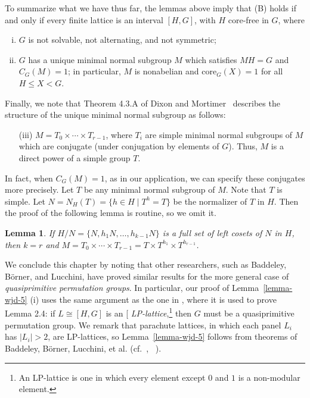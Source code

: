 \documentclass[cm,dissertation]{uhthesis}
\theoremstyle{plain}
\newtheorem{lemma}[theorem]{Lemma}
\theoremstyle{definition}
\theoremstyle{remark}
\numberwithin{theorem}{section}
\numberwithin{claim}{chapter}
\numberwithin{equation}{section}
\numberwithin{conjecture}{chapter}
\newcommand{\<}{\ensuremath{\langle}}
\renewcommand{\>}{\ensuremath{\rangle}}
\renewcommand{\leq}{\ensuremath{\leqslant}}
\newcommand{\core}{\ensuremath{\mathrm{core}}}
\newcommand{\0}{\ensuremath{\mathbf{0}}}
\newcommand{\1}{\ensuremath{\mathbf{1}}}
\newcommand{\2}{\ensuremath{\mathbf{2}}}
\newcommand{\3}{\ensuremath{\mathbf{3}}}
\newcommand{\4}{\ensuremath{\mathbf{4}}}
\newcommand{\5}{\ensuremath{\mathbf{5}}}
\newcommand{\indexit}[1]{\index{#1|textit}}
\def\defn#1{\gdef\defnstring{#1}%
  \xdef\dodefnii{{\noexpand\em
       \defnstring}\noexpand\indexit{\defnstring}\noexpand\makeatother}%
  \futurelet\nextthing\dodefn}
\def\dodefn{%
  \ifx\nextthing[\let\next=\dodefni
    \else\let\next=\dodefnii\fi
  \makeatletter
  \next}
\def\dodefni[#1]{%
  {\em\defnstring}%
  \indexit{#1}%
  \makeatother}
\begin{document}
To summarize what we have thus far, the lemmas above imply that (B) holds if and only if
every finite lattice is an interval $[H, G]$, with $H$ core-free in $G$, where
\begin{enumerate}[(i)]
\item $G$ is not solvable, not alternating, and not symmetric;
\item $G$ has a unique minimal normal subgroup $M$ which satisfies $MH = G$
and $C_G(M) = 1$; in particular,
$M$ is nonabelian and $\core_G(X) = 1$ for all $H\leq X < G$.
\end{enumerate}

Finally, we note that Theorem 4.3.A of Dixon and Mortimer~\cite{Dixon:1996}
describes the structure of the unique minimal normal subgroup as follows:
\begin{enumerate}[(i)]
\item[(iii)] $M = T_0\times \cdots \times T_{r-1}$, where $T_i$ are simple minimal normal subgroups of
  $M$ which are conjugate (under conjugation by elements of $G$). Thus, $M$ is a
  direct power of a simple group $T$.
\end{enumerate}
  In fact, when $C_G(M)=1$, as in our application,
we can specify these conjugates more precisely. %
Let $T$ be any minimal normal subgroup of $M$. Note that $T$ is simple.
Let $N = N_H(T) = \{h\in H \mid T^h = T\}$ be the normalizer of $T$ in
$H$.  Then the proof of the following lemma is routine, so we omit it.
\begin{lemma}
If $H/N = \{N, h_1N, \dots, h_{k-1}N\}$ is a full set of left cosets of $N$
in $H$, then $k=r$ and $M = T_0\times \cdots \times T_{r-1} = T \times
T^{h_1} \times T^{h_{r-1}}$. 
\end{lemma}

%
%
%
We conclude this chapter by noting that other researchers, such as Baddeley,
B\"orner, and Lucchini, have proved similar results 
for the more general case of \emph{quasiprimitive permutation groups}. 
In particular, our proof of Lemma~\ref{lemma-wjd-5} (i) uses the same argument
as the one in \cite{Borner:1999}, where it is used to prove Lemma 2.4: if $L
\cong [H, G]$ is an \defn{LP-lattice},\footnote{An LP-lattice is one in which
  every element except $0$ and $1$ is a non-modular element.}
then $G$ must be a quasiprimitive permutation 
group.  
We remark that parachute lattices, in which each panel
 $L_i$ has $|L_i|>2$, are LP-lattices, so
Lemma~\ref{lemma-wjd-5} follows from
theorems of Baddeley, B\"orner, Lucchini, et al. 
(cf.~\cite{Lucchini:1997}, ~\cite{Borner:1999}).
\end{document}
